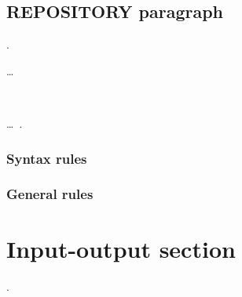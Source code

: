 \subsection{REPOSITORY paragraph}

\begin{syntax}
  .

  \begin{0-1}
    \begin{1=}
      \begin{1=}
        \begin{1=}
          \functionname
        \end{1=}\ldots \\

      \end{1=}
       \\

       \functionname
      \begin{0-1}
         \literal
      \end{0-1}
    \end{1=}\ldots\ {}.
  \end{0-1}
\end{syntax}

\subsubsection{Syntax rules}

\subsubsection{General rules}

\section{Input-output section}

\begin{syntax}
  \begin{0-1}
     .
  \end{0-1}\newline
  \begin{0-1}
  \end{0-1}\newline
  \begin{0-1}
  \end{0-1}
\end{syntax}

